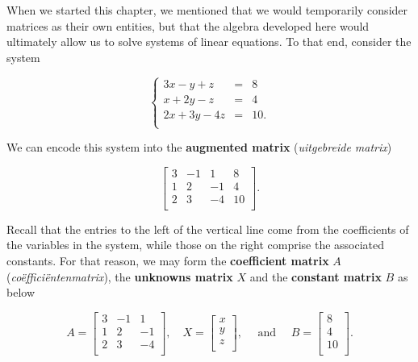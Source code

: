 \smallskip

When we started this chapter, we mentioned that we would temporarily consider matrices as their own entities, but that the algebra developed here would ultimately allow us to solve systems of linear equations.  To that end, consider the system

\[\left\{ \begin{array}{rcl} 3x  - y  + z & = & 8 \\ x +  2y  -  z & = & 4 \\  2x+ 3y - 4z & = & 10. \\  \end{array} \right.\]

We can encode this system into the \textbf{augmented matrix} (\textit{uitgebreide matrix})


\[\left[ \begin{array}{rrr|r} 3 & -1 & 1 & 8 \\ 1 & 2 & -1 & 4 \\ 2 & 3 & -4 & 10 \\ \end{array} \right].\]



Recall that the entries to the left of the vertical line come from the coefficients of the variables in the system, while those on the right comprise the associated constants.  For that reason, we may form the  \textbf{coefficient matrix} $A$ (\textit{co\"effici\"entenmatrix}), the  \textbf{unknowns matrix} $X$  and the  \textbf{constant matrix} $B$ as below

\[ A = \left[ \begin{array}{rrr} 3 & -1 & 1  \\ 1 & 2 & -1  \\ 2 & 3 & -4  \\ \end{array} \right],
\quad
X = \left[ \begin{array}{r}  x \\  y \\  z \\ \end{array} \right],\quad \text{ and } \quad
B = \left[ \begin{array}{r}  8 \\  4 \\  10 \\ \end{array} \right].
\]


